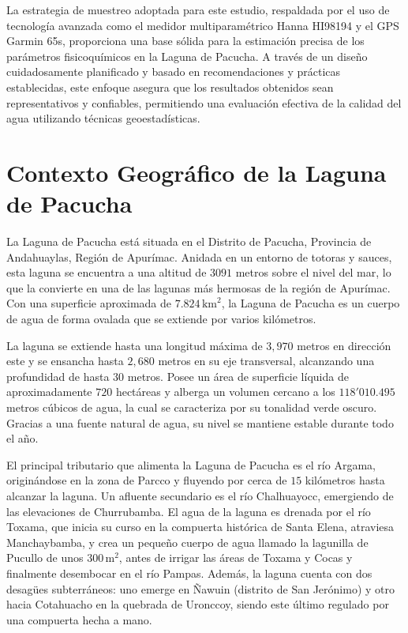 La estrategia de muestreo adoptada para este estudio, respaldada por el uso de tecnología avanzada como el medidor multiparamétrico Hanna HI98194 y el GPS Garmin 65s, proporciona una base sólida para la estimación precisa de los parámetros fisicoquímicos en la Laguna de Pacucha. A través de un diseño cuidadosamente planificado y basado en recomendaciones y prácticas establecidas, este enfoque asegura que los resultados obtenidos sean representativos y confiables, permitiendo una evaluación efectiva de la calidad del agua utilizando técnicas geoestadísticas.

\section{Contexto Geográfico de la Laguna de Pacucha}

La Laguna de Pacucha está situada en el Distrito de Pacucha, Provincia de Andahuaylas, Región de Apurímac. Anidada en un entorno de totoras y sauces, esta laguna se encuentra a una altitud de \(3091\) metros sobre el nivel del mar, lo que la convierte en una de las lagunas más hermosas de la región de Apurímac. Con una superficie aproximada de \(7.824\, \text{km}^2\), la Laguna de Pacucha es un cuerpo de agua de forma ovalada que se extiende por varios kilómetros.

La laguna se extiende hasta una longitud máxima de \(3,970\) metros en dirección este y se ensancha hasta \(2,680\) metros en su eje transversal, alcanzando una profundidad de hasta \(30\) metros. Posee un área de superficie líquida de aproximadamente \(720\) hectáreas y alberga un volumen cercano a los \(118'010.495\) metros cúbicos de agua, la cual se caracteriza por su tonalidad verde oscuro. Gracias a una fuente natural de agua, su nivel se mantiene estable durante todo el año.

El principal tributario que alimenta la Laguna de Pacucha es el río Argama, originándose en la zona de Parcco y fluyendo por cerca de \(15\) kilómetros hasta alcanzar la laguna. Un afluente secundario es el río Chalhuayocc, emergiendo de las elevaciones de Churrubamba. El agua de la laguna es drenada por el río Toxama, que inicia su curso en la compuerta histórica de Santa Elena, atraviesa Manchaybamba, y crea un pequeño cuerpo de agua llamado la lagunilla de Pucullo de unos \(300\, \text{m}^2\), antes de irrigar las áreas de Toxama y Cocas y finalmente desembocar en el río Pampas. Además, la laguna cuenta con dos desagües subterráneos: uno emerge en Ñawuin (distrito de San Jerónimo) y otro hacia Cotahuacho en la quebrada de Uronccoy, siendo este último regulado por una compuerta hecha a mano.


